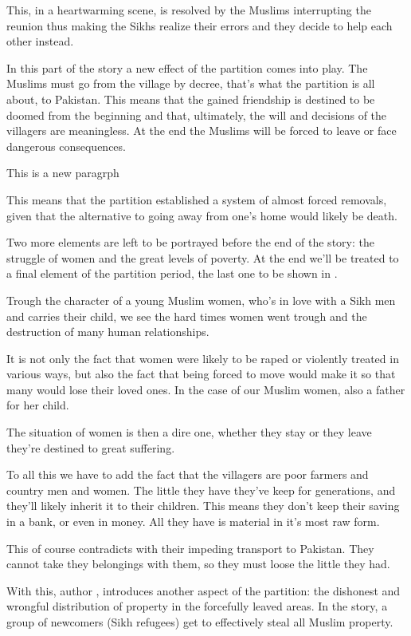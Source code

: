 \documentclass{scrartcl}
\begin{document}
This, in a heartwarming scene, is resolved
by the Muslims interrupting the reunion
thus making the Sikhs realize their errors
and they decide to help each other instead.

In this part of the story a new effect of the
partition comes into play.
The Muslims must go from the village by decree,
that's what the partition is all about,
to Pakistan.
This means that the gained friendship is destined
to be doomed from the beginning
and that, ultimately,
the will and decisions of the villagers are meaningless.
At the end the Muslims will be forced to leave or
face dangerous consequences.

This is a new paragrph

This means that the partition established a system
of almost forced removals, given that the alternative
to going away from one's home would likely be death.

Two more elements are left to be portrayed
before the end of the story:
the struggle of women and the great levels of poverty.
At the end we'll be treated to a final element of the partition
period, the last one to be shown in \tpak.

Trough the character of a young Muslim women,
who's in love with a Sikh men and carries their child,
we see the hard times women went trough and
the destruction of many human relationships.

It is not only the fact that women were
likely to be raped or violently treated in various ways,
but also the fact that being forced to move would
make it so that many would lose their loved ones.
In the case of our Muslim women, also a father for her child.

The situation of women is then a dire one,
whether they stay or they leave they're destined
to great suffering.

To all this we have to add the fact that the villagers
are poor farmers and country men and women.
The little they have they've keep for generations,
and they'll likely inherit it to their children.
This means they don't keep their saving in a bank,
or even in money.
All they have is material in it's most raw form.

This of course contradicts with their impeding
transport to Pakistan.
They cannot take they belongings with them,
so they must loose the little they had.

With this, author \ks, introduces another aspect of
the partition: the dishonest and wrongful distribution
of property in the forcefully leaved areas.
In the story, a group of newcomers (Sikh refugees)
get to effectively steal all Muslim property.
\end{document}
